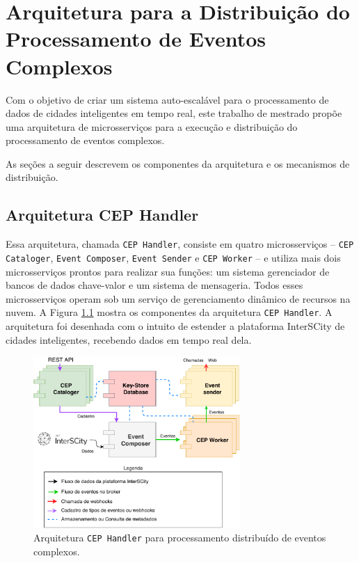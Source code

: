 \chapter{Arquitetura para a Distribuição do Processamento de Eventos Complexos}
\label{cap:arquitetura}

Com o objetivo de criar um sistema auto-escalável para o processamento de dados de cidades inteligentes em tempo real, este trabalho de mestrado propõe uma arquitetura de microsserviços para a execução e distribuição do processamento de eventos complexos.

As seções a seguir descrevem os componentes da arquitetura e os mecanismos de distribuição.

\section{Arquitetura CEP Handler}
Essa arquitetura, chamada \texttt{CEP Handler}, consiste em quatro microsserviços -- \texttt{CEP Cataloger}, \texttt{Event Composer}, \texttt{Event Sender} e \texttt{CEP Worker} -- e utiliza mais dois microsserviços prontos para realizar sua funções: um sistema gerenciador de bancos de dados chave-valor e um sistema de mensageria. Todos esses microsserviços operam sob um serviço de gerenciamento dinâmico de recursos na nuvem. 
A Figura \ref{fig:system_architecture} mostra os componentes da arquitetura \texttt{CEP Handler}. A arquitetura foi desenhada com o intuito de estender a plataforma InterSCity de cidades inteligentes, recebendo dados em tempo real dela. 

\begin{figure}[hb]
      \centering
      \includegraphics[width=0.7\textwidth]{figuras/neopr.pdf}
      \caption{Arquitetura \texttt{CEP Handler} para processamento distribuído de eventos complexos.}
      \label{fig:system_architecture}
\end{figure}

